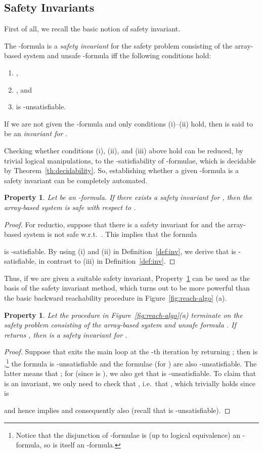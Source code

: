\documentclass{LMCS}
\theoremstyle{plain}\newtheorem{assumption}[thm]{Assumption}
\theoremstyle{plain}\newtheorem{proposition}[thm]{Proposition}
\theoremstyle{plain}\newtheorem{property}[thm]{Property}
\theoremstyle{plain}\newtheorem{example}[thm]{Example}
\theoremstyle{plain}\newtheorem{claim}[thm]{Claim}
\theoremstyle{plain}\newtheorem{lemma}[thm]{Lemma}
\begin{document}
\subsection{Safety Invariants}
\label{subsec:dec+inv}
First of all, we recall the basic notion of safety invariant.
\begin{defi}
  \label{def:inv}
  The -formula  is a \emph{safety invariant} for the
  safety problem consisting of the array-based system
   and unsafe -formula  iff the following
  conditions hold:
  \begin{enumerate}[{\rm (i)}]
    \item ,
    \item , and
    \item  is -unsatisfiable.
  \end{enumerate}
  If we are not given the -formula  and only conditions
  (i)--(ii) hold, then  is said to be an \emph{invariant for }.
\end{defi}
Checking whether conditions (i), (ii), and (iii) above hold can be
reduced, by trivial logical manipulations, to the
-satisfiability of -formulae, which is
decidable by Theorem~\ref{th:decidability}.  So, establishing whether
a given -formula  is a safety invariant can be
completely automated.
\begin{property}
  \label{prop:inv-method}
  Let  be an -formula.  If there exists a safety
  invariant for , then the array-based system  is
  safe with respect to .
\end{property}
\begin{proof}
  For reductio, suppose that there is a safety invariant for  and
  the array-based system  is not safe w.r.t.\ .
  This implies that the formula
  
  is -satisfiable. By using (i) and (ii) in
  Definition~\ref{def:inv}, we derive that  is
  -satisfiable, in contrast to (iii) in
  Definition~\ref{def:inv}.
\end{proof}
Thus, if we are given a suitable safety invariant,
Property~\ref{prop:inv-method} can be used as the basis of the safety
invariant method, which turns out to be more powerful than the basic
backward reachability procedure in Figure~\ref{fig:reach-algo} (a).
\begin{property}
  \label{ex:basic}
  Let the procedure  in Figure~\ref{fig:reach-algo}(a)
  terminate on the safety problem consisting of the array-based system
   and unsafe formula .  If 
  returns , then  is a safety invariant for
  .
\end{property}
\begin{proof}
  Suppose that  exits the main loop at the -th
  iteration by returning ; then  is ,\footnote{Notice that the disjunction of -formulae is
    (up to logical equivalence) an -formula, so  is
    itself an -formula.}  the formula  is -unsatisfiable and the formulae  (for ) are also
  -unsatisfiable.  The latter means that ; for  (since  is ),
  we also get that  is
  -unsatisfiable.  To claim that  is an invariant,
  we only need to check that , i.e.\ that , which trivially holds since
 is

and hence implies
  and consequently also  (recall that
   is -unsatisfiable).
\end{proof}
\end{document}
